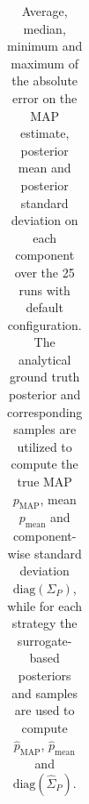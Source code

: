 \begin{table}[H]
\begin{centering}
\begin{tabular}{ccccccccccccc}
    \bottomrule
    \end{tabular}

    \caption{Average, median, minimum and maximum of the absolute error on the MAP estimate, posterior mean and posterior standard deviation on each component over the 25 runs with default configuration.
    The analytical ground truth posterior and corresponding samples are utilized to compute the true MAP $p_\text{MAP}$, mean $p_\text{mean}$ and component-wise standard deviation $\text{diag}(\Sigma_P)$, while for each strategy the surrogate-based posteriors and samples are used to compute $\hat p_\text{MAP}$, $\hat p_\text{mean}$ and $\text{diag}(\hat \Sigma_P)$.
    }
    \label{tab:3d-comparison}
    \end{centering}
    
    
\end{table}

